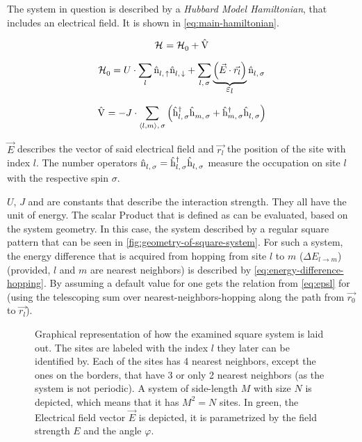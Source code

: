 The system in question is described by a \emph{Hubbard Model Hamiltonian}, that includes an electrical field. It is shown in \autoref{eq:main-hamiltonian}.


\begin{equation}
    \label{eq:main-hamiltonian}
    \pictureHamiltonian = \HzeroHamiltonian + \Vhamiltonian
\end{equation}

\begin{equation}
    \label{eq:main-hamiltonian-h0}
    \HzeroHamiltonian = U \cdot \lsum \nop{l}{\up}\nop{l}{\down} + \lsum[l,\,\sigma] \underbrace{\left(\vec{E} \cdot \vec{r_l}\right)}_{\text{\normalsize \epsl}} \nop{l}{\sigma}
\end{equation}

\begin{equation}
    \label{eq:main-hamiltonian-perturbation}
    \Vhamiltonian =  - J \cdot \neighborsumWSpin{l}{m}{\sigma} \left(\withspinhcop{l}{\sigma}{\dagger} \withspinhcop{m}{\sigma}{} + \withspinhcop{m}{\sigma}{\dagger} \withspinhcop{l}{\sigma}{} \right)
\end{equation}

$\vec{E}$ describes the vector of said electrical field and $\vec{r_l}$ the position of the site with index $l$.
The number operators $\hat{\text{n}}^{ }_{l,\,\sigma} = \hat{\text{h}}^{\dagger }_{l,\,\sigma}\hat{\text{h}}^{ }_{l,\,\sigma}$ measure the occupation on site $l$ with the respective spin $\sigma$. 

$U$, $J$ and \epsl[] are constants that describe the interaction strength. 
They all have the unit of energy. 
The scalar Product that is defined as \epsl[] can be evaluated, based on the system geometry. 
In this case, the system described by a regular square pattern that can be seen in \autoref{fig:geometry-of-square-system}. 
For such a system, the energy difference that is acquired from hopping from site $l$ to $m$ ($\Delta E_{l \rightarrow m}$) (provided, $l$ and $m$ are nearest neighbors) is described by \autoref{eq:energy-difference-hopping}. By assuming a default value for \epsl[0] one gets the relation from \autoref{eq:epsl} for \epsl{} (using the telescoping sum over nearest-neighbors-hopping along the path from $\vec{r_0}$ to $\vec{r_l}$). 

\begin{figure}[htbp]
    \centering
            
    \vspace{0.8cm}
    \caption{Graphical representation of how the examined square system is laid out. The sites are labeled with the index $l$ they later can be identified by. Each of the sites has 4 nearest neighbors, except the ones on the borders, that have 3 or only 2 nearest neighbors (as the system is not periodic). A system of side-length $M$ with size $N$ is depicted, which means that it has $M^2 = N$ sites.
    In green, the Electrical field vector $\vec{E}$ is depicted, it is parametrized by the field strength $E$ and the angle $\varphi$.}
    \label{fig:geometry-of-square-system}
\end{figure}

